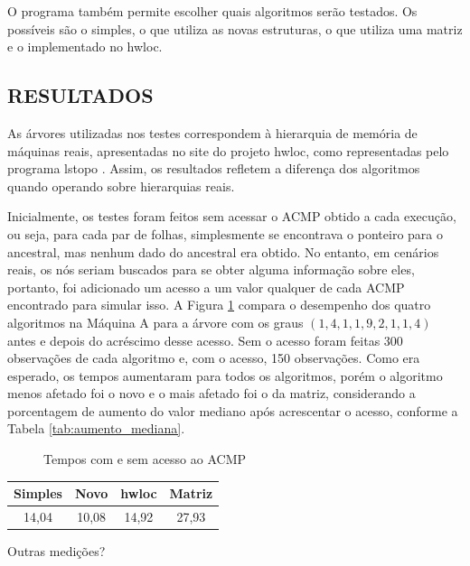 O programa também permite escolher quais algoritmos serão testados.
Os possíveis são o simples, o que utiliza as novas estruturas, o que utiliza uma matriz e o implementado no hwloc.



\subsection{RESULTADOS}

As árvores utilizadas nos testes correspondem à hierarquia de memória de máquinas reais, apresentadas no site do projeto hwloc, como representadas pelo programa lstopo \cite{lstopo}.
Assim, os resultados refletem a diferença dos algoritmos quando operando sobre hierarquias reais.

Inicialmente, os testes foram feitos sem acessar o ACMP obtido a cada execução, ou seja, para cada par de folhas, simplesmente se encontrava o ponteiro para o ancestral, mas nenhum dado do ancestral era obtido.
No entanto, em cenários reais, os nós seriam buscados para se obter alguma informação sobre eles, portanto, foi adicionado um acesso a um valor qualquer de cada ACMP encontrado para simular isso.
A Figura \ref{fig:box_sem_com} compara o desempenho dos quatro algoritmos na Máquina A para a árvore com os graus $(1, 4, 1, 1, 9, 2, 1, 1, 4)$ antes e depois do acréscimo desse acesso.
Sem o acesso foram feitas 300 observações de cada algoritmo e, com o acesso, 150 observações.
Como era esperado, os tempos aumentaram para todos os algoritmos, porém o algoritmo menos afetado foi o novo e o mais afetado foi o da matriz, considerando a porcentagem de aumento do valor mediano após acrescentar o acesso, conforme a Tabela \ref{tab:aumento_mediana}.

\begin{figure}
	\caption{Tempos com e sem acesso ao ACMP}
	\label{fig:box_sem_com}
	\resizebox{\textwidth}{!}{}
\end{figure}

\begin{table}[htb]
	{\begin{tabular}{cccc}
		\toprule
		Simples & Novo & hwloc & Matriz \\
		\midrule 
		14,04 & 10,08 & 14,92 & 27,93 \\
		\bottomrule
	\end{tabular}}{}%
\end{table}


Outras medições?
